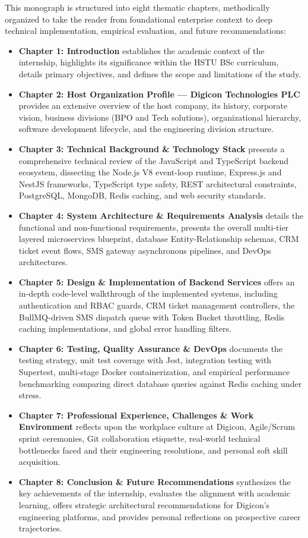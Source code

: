 This monograph is structured into eight thematic chapters, methodically organized to take the reader from foundational enterprise context to deep technical implementation, empirical evaluation, and future recommendations:

\begin{itemize}
    \item \textbf{Chapter 1: Introduction} establishes the academic context of the internship, highlights its significance within the HSTU BSc curriculum, details primary objectives, and defines the scope and limitations of the study.
    \item \textbf{Chapter 2: Host Organization Profile — Digicon Technologies PLC} provides an extensive overview of the host company, its history, corporate vision, business divisions (BPO and Tech solutions), organizational hierarchy, software development lifecycle, and the engineering division structure.
    \item \textbf{Chapter 3: Technical Background \& Technology Stack} presents a comprehensive technical review of the JavaScript and TypeScript backend ecosystem, dissecting the Node.js V8 event-loop runtime, Express.js and NestJS frameworks, TypeScript type safety, REST architectural constraints, PostgreSQL, MongoDB, Redis caching, and web security standards.
    \item \textbf{Chapter 4: System Architecture \& Requirements Analysis} details the functional and non-functional requirements, presents the overall multi-tier layered microservices blueprint, database Entity-Relationship schemas, CRM ticket event flows, SMS gateway asynchronous pipelines, and DevOps architectures.
    \item \textbf{Chapter 5: Design \& Implementation of Backend Services} offers an in-depth code-level walkthrough of the implemented systems, including authentication and RBAC guards, CRM ticket management controllers, the BullMQ-driven SMS dispatch queue with Token Bucket throttling, Redis caching implementations, and global error handling filters.
    \item \textbf{Chapter 6: Testing, Quality Assurance \& DevOps} documents the testing strategy, unit test coverage with Jest, integration testing with Supertest, multi-stage Docker containerization, and empirical performance benchmarking comparing direct database queries against Redis caching under stress.
    \item \textbf{Chapter 7: Professional Experience, Challenges \& Work Environment} reflects upon the workplace culture at Digicon, Agile/Scrum sprint ceremonies, Git collaboration etiquette, real-world technical bottlenecks faced and their engineering resolutions, and personal soft skill acquisition.
    \item \textbf{Chapter 8: Conclusion \& Future Recommendations} synthesizes the key achievements of the internship, evaluates the alignment with academic learning, offers strategic architectural recommendations for Digicon's engineering platforms, and provides personal reflections on prospective career trajectories.
\end{itemize}
